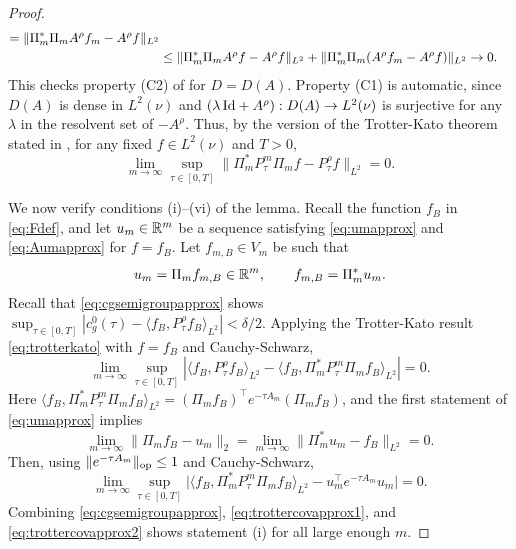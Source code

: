 \begin{proof}
\begin{align}
=\|\Pi_m^*\Pi_m A^\rho f_m-A^\rho f\|_{L^2}\notag\\
&\leq \|\Pi_m^*\Pi_m A^\rho f-A^\rho f\|_{L^2}
+\|\Pi_m^*\Pi_m(A^\rho f_m-A^\rho f)\|_{L^2} \to 0.\label{eq:Aumapprox}
\end{align}
This checks property (C2) of \cite[Proposition 3.1]{ito1998trotter}
for $D=D(A)$. Property (C1) is automatic, since $D(A)$ is dense in $L^2(\nu)$
\cite[Theorem 1.4]{engel2000one}
and $(\lambda\,\mathrm{Id}+A^\rho):D(A) \to L^2(\nu)$ is surjective for any $\lambda$
in the resolvent set of ${-}A^\rho$. Thus, by the version of
the Trotter-Kato theorem stated in \cite[Theorem 2.1, Proposition
3.1]{ito1998trotter}, for any fixed $f \in L^2(\nu)$ and $T>0$,
\begin{equation}\label{eq:trotterkato}
\lim_{m \to \infty} \sup_{\tau \in [0,T]} \|\Pi_m^*P_\tau^m \Pi_m f
-P_\tau^\rho f\|_{L^2}=0.
\end{equation}

We now verify conditions (i)--(vi) of the lemma.
Recall the function $f_B$ in \eqref{eq:Fdef}, and let $u_m \in \mathbb{R}^m$
be a sequence satisfying \eqref{eq:umapprox} and \eqref{eq:Aumapprox}
for $f=f_B$. Let $f_{m,B} \in V_m$ be such that
\[u_m=\Pi_m f_{m,B} \in \mathbb{R}^m, \qquad f_{m,B}=\Pi_m^* u_m.\]
Recall that \eqref{eq:cgsemigroupapprox} shows
$\sup_{\tau \in [0,T]}
|c_g^0(\tau)-\langle f_B,P_\tau^\rho f_B \rangle_{L^2}|<\delta/2$.
Applying the Trotter-Kato result \eqref{eq:trotterkato} with $f=f_B$ and
Cauchy-Schwarz,
\begin{equation}\label{eq:trottercovapprox1}
\lim_{m \to \infty}
\sup_{\tau \in [0,T]} |\langle f_B,P_\tau^\rho f_B \rangle_{L^2}
-\langle f_B,\Pi_m^*P_\tau^m \Pi_m f_B \rangle_{L^2}|=0.
\end{equation}
Here $\langle f_B,\Pi_m^*P_\tau^m \Pi_mf_B \rangle_{L^2}=(\Pi_m f_B)^\top
e^{-\tau A_m} (\Pi_m f_B)$, and the first statement of
\eqref{eq:umapprox} implies
\[\lim_{m \to \infty}
\|\Pi_m f_B-u_m\|_2=\lim_{m \to \infty} 
\|\Pi_m^*u_m-f_B\|_{L^2}=0.\]
Then, using $\|e^{-\tau A_m}\|_{\mathrm{op}} \leq 1$ and Cauchy-Schwarz,
\begin{equation}\label{eq:trottercovapprox2}
\lim_{m \to \infty} \sup_{\tau \in [0,T]}
\Big|\langle f_B,\Pi_m^* P_\tau^m \Pi_m f_B \rangle_{L^2}-u_m^\top e^{-\tau A_m}u_m\Big|=0.
\end{equation}
Combining \eqref{eq:cgsemigroupapprox}, 
\eqref{eq:trottercovapprox1}, and \eqref{eq:trottercovapprox2} shows
statement (i) for all large enough $m$.


\end{proof}
